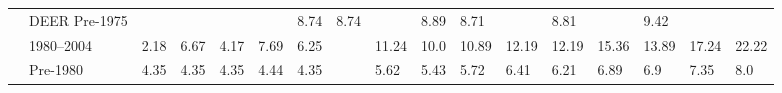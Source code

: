 \begin{table}
\begin{tabular}{p{0.3in}p{0.5in}p{0.15in}p{0.15in}p{0.15in}p{0.15in}p{0.15in}p{0.15in}p{0.15in}p{0.15in}p{0.15in}p{0.15in}p{0.15in}p{0.15in}p{0.15in}p{0.15in}p{0.15in}}
           & DEER Pre-1975 &        &        &        &        &   8.74 &   8.74 &        &   8.89 &   8.71 &        &   8.81 &        &   9.42 &        &        \\
           & 1980--2004 &   2.18 &   6.67 &   4.17 &   7.69 &   6.25 &        &  11.24 &   10.0 &  10.89 &  12.19 &  12.19 &  15.36 &  13.89 &  17.24 &  22.22 \\
           & Pre-1980 &   4.35 &   4.35 &   4.35 &   4.44 &   4.35 &        &   5.62 &   5.43 &   5.72 &   6.41 &   6.21 &   6.89 &    6.9 &   7.35 &    8.0 \\ \hline
\end{tabular}
\end{table}
